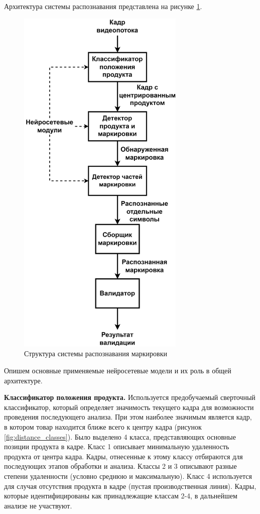 Архитектура системы распознавания представлена на рисунке \ref{fig:structure}.

\begin{figure}[!ht]
	\centering
	\includegraphics[width=8cm]{man-source/images/ch4/savushkin_structure.png}
	\caption{Структура системы распознавания маркировки}
	\label{fig:structure}
\end{figure}

Опишем основные применяемые нейросетевые модели и их роль в общей архитектуре.

\textbf{Классификатор положения продукта.} Используется предобучаемый сверточный классификатор, который определяет значимость текущего кадра для возможности проведения последующего анализа. При этом наиболее значимым является кадр, в котором товар находится ближе всего к центру кадра (рисунок \ref{fig:distance_classes}). Было выделено 4 класса, представляющих основные позиции продукта в кадре. Класс 1 описывает минимальную удаленность продукта от центра кадра. Кадры, отнесенные к этому классу отбираются для последующих этапов обработки и анализа. Классы 2 и 3 описывают разные степени удаленности (условно среднюю и максимальную). Класс 4 используется для случая отсутствия продукта в кадре (пустая производственная линия).
Кадры, которые идентифицированы как принадлежащие классам 2-4, в дальнейшем анализе не участвуют. 

